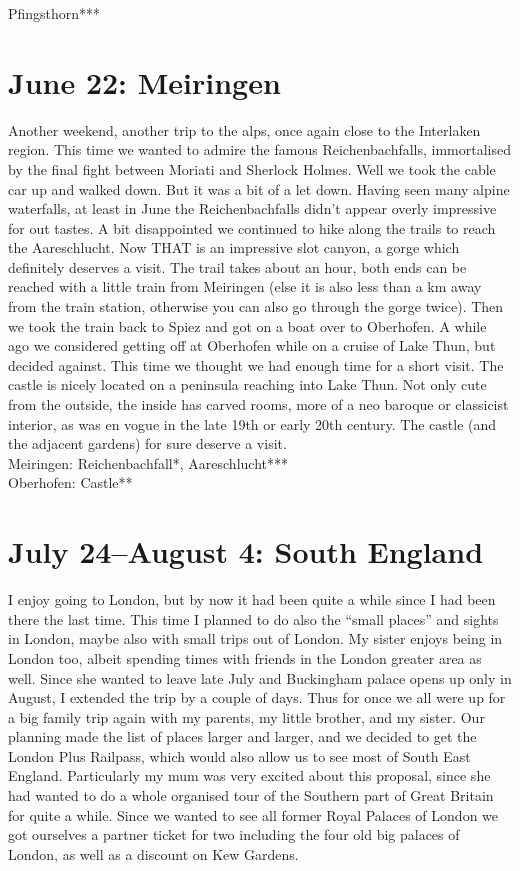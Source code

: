 Pfingsthorn***

\section{June 22: Meiringen}
\label{Meiringen2014}

Another weekend, another trip to the alps, once again close to the Interlaken region. This time we wanted to admire the famous Reichenbachfalls, immortalised by the final fight between Moriati and Sherlock Holmes. Well we took the cable car up and walked down. But it was a bit of a let down. Having seen many alpine waterfalls, at least in June the Reichenbachfalls didn't appear overly impressive for out tastes. A bit disappointed we continued to hike along the trails to reach the Aareschlucht. Now THAT is an impressive slot canyon, a gorge which definitely deserves a visit. The trail takes about an hour, both ends can be reached with a little train from Meiringen (else it is also less than a km away from the train station, otherwise you can also go through the gorge twice). Then we took the train back to Spiez and got on a boat over to Oberhofen. A while ago we considered getting off at Oberhofen while on a cruise of Lake Thun, but decided against. This time we thought we had enough time for a short visit. The castle is nicely located on a peninsula reaching into Lake Thun. Not only cute from the outside, the inside has carved rooms, more of a neo baroque or classicist interior, as was en vogue in the late 19th or early 20th century. The castle (and the adjacent gardens) for sure deserve a visit.\\

Meiringen: Reichenbachfall*, Aareschlucht***\\
Oberhofen: Castle**

\section{July 24--August 4: South England}
\label{southengland2014}

I enjoy going to London, but by now it had been quite a while since I had been there the last time. This time I planned to do also the ``small places'' and sights in London, maybe also with small trips out of London. My sister enjoys being in London too, albeit spending times with friends in the London greater area as well. Since she wanted to leave late July and Buckingham palace opens up only in August, I extended the trip by a couple of days. Thus for once we all were up for a big family trip again with my parents, my little brother, and my sister. Our planning made the list of places larger and larger, and we decided to get the London Plus Railpass, which would also allow us to see most of South East England. Particularly my mum was very excited about this proposal, since she had wanted to do a whole organised tour of the Southern part of Great Britain for quite a while. Since we wanted to see all former Royal Palaces of London we got ourselves a partner ticket for two including the four old big palaces of London, as well as a discount on Kew Gardens.\\

